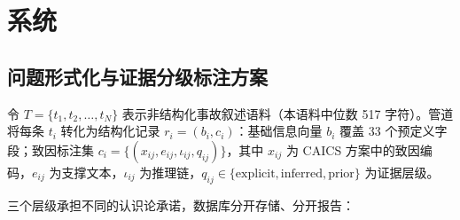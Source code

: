 \documentclass[11pt]{article}
\begin{document}
\section{{\cjkfont 系\allowbreak 统}}
\subsection{{\cjkfont 问\allowbreak 题\allowbreak 形\allowbreak 式\allowbreak 化\allowbreak 与\allowbreak 证\allowbreak 据\allowbreak 分\allowbreak 级\allowbreak 标\allowbreak 注\allowbreak 方\allowbreak 案}}
{\cjkfont 令} $T = \{t_1, t_2, \dots, t_N\}$ {\cjkfont 表\allowbreak 示\allowbreak 非\allowbreak 结\allowbreak 构\allowbreak 化\allowbreak 事\allowbreak 故\allowbreak 叙\allowbreak 述\allowbreak 语\allowbreak 料\allowbreak （\allowbreak 本\allowbreak 语\allowbreak 料\allowbreak 中\allowbreak 位\allowbreak 数} 517 {\cjkfont 字\allowbreak 符\allowbreak ）\allowbreak 。\allowbreak 管\allowbreak 道\allowbreak 将\allowbreak 每\allowbreak 条} $t_i$ {\cjkfont 转\allowbreak 化\allowbreak 为\allowbreak 结\allowbreak 构\allowbreak 化\allowbreak 记\allowbreak 录} $r_i = (b_i, c_i)${\cjkfont ：\allowbreak 基\allowbreak 础\allowbreak 信\allowbreak 息\allowbreak 向\allowbreak 量} $b_i$ {\cjkfont 覆\allowbreak 盖} 33 {\cjkfont 个\allowbreak 预\allowbreak 定\allowbreak 义\allowbreak 字\allowbreak 段\allowbreak ；\allowbreak 致\allowbreak 因\allowbreak 标\allowbreak 注\allowbreak 集} $c_i = \{(x_{ij}, e_{ij}, \iota_{ij}, q_{ij})\}${\cjkfont ，\allowbreak 其\allowbreak 中} $x_{ij}$ {\cjkfont 为} CAICS {\cjkfont 方\allowbreak 案\allowbreak 中\allowbreak 的\allowbreak 致\allowbreak 因\allowbreak 编\allowbreak 码\allowbreak ，}$e_{ij}$ {\cjkfont 为\allowbreak 支\allowbreak 撑\allowbreak 文\allowbreak 本\allowbreak ，}$\iota_{ij}$ {\cjkfont 为\allowbreak 推\allowbreak 理\allowbreak 链\allowbreak ，}$q_{ij} \in \{\text{explicit}, \text{inferred}, \text{prior}\}$ {\cjkfont 为\allowbreak 证\allowbreak 据\allowbreak 层\allowbreak 级\allowbreak 。}

{\cjkfont 三\allowbreak 个\allowbreak 层\allowbreak 级\allowbreak 承\allowbreak 担\allowbreak 不\allowbreak 同\allowbreak 的\allowbreak 认\allowbreak 识\allowbreak 论\allowbreak 承\allowbreak 诺\allowbreak ，\allowbreak 数\allowbreak 据\allowbreak 库\allowbreak 分\allowbreak 开\allowbreak 存\allowbreak 储\allowbreak 、\allowbreak 分\allowbreak 开\allowbreak 报\allowbreak 告\allowbreak ：}
\end{document}
